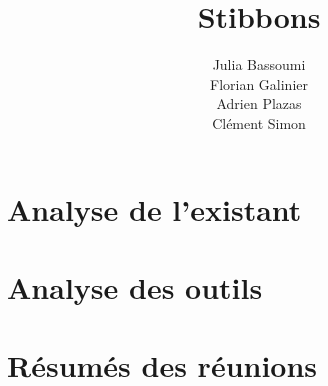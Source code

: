 \documentclass[a4paper,11pt]{report}
\title{Stibbons}
\author{Julia Bassoumi\\Florian Galinier\\Adrien Plazas\\Clément Simon}
\begin{document}
\maketitle
\tableofcontents

\begin{abstract}
\end{abstract}

\chapter{Analyse de l'existant}




\chapter{Analyse des outils}







\appendix

\chapter{Résumés des réunions}



\end{document}
